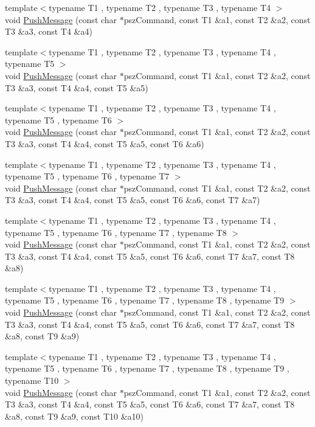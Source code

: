 \begin{DoxyCompactItemize}
\item 
{\footnotesize template$<$typename T1 , typename T2 , typename T3 , typename T4 $>$ }\\void \hyperlink{class_c_node_a2958ee10e2c96ef647787bce80196079}{Push\+Message} (const char $\ast$psz\+Command, const T1 \&a1, const T2 \&a2, const T3 \&a3, const T4 \&a4)
\item 
{\footnotesize template$<$typename T1 , typename T2 , typename T3 , typename T4 , typename T5 $>$ }\\void \hyperlink{class_c_node_a1f58deeed29baf57c49dae177f8be826}{Push\+Message} (const char $\ast$psz\+Command, const T1 \&a1, const T2 \&a2, const T3 \&a3, const T4 \&a4, const T5 \&a5)
\item 
{\footnotesize template$<$typename T1 , typename T2 , typename T3 , typename T4 , typename T5 , typename T6 $>$ }\\void \hyperlink{class_c_node_a4addbff355c502fb2f8c10451e76373d}{Push\+Message} (const char $\ast$psz\+Command, const T1 \&a1, const T2 \&a2, const T3 \&a3, const T4 \&a4, const T5 \&a5, const T6 \&a6)
\item 
{\footnotesize template$<$typename T1 , typename T2 , typename T3 , typename T4 , typename T5 , typename T6 , typename T7 $>$ }\\void \hyperlink{class_c_node_ab3611cdb08d5f25a4da05fe140e48625}{Push\+Message} (const char $\ast$psz\+Command, const T1 \&a1, const T2 \&a2, const T3 \&a3, const T4 \&a4, const T5 \&a5, const T6 \&a6, const T7 \&a7)
\item 
{\footnotesize template$<$typename T1 , typename T2 , typename T3 , typename T4 , typename T5 , typename T6 , typename T7 , typename T8 $>$ }\\void \hyperlink{class_c_node_af91d09012aa7e879be4b488b0bba903d}{Push\+Message} (const char $\ast$psz\+Command, const T1 \&a1, const T2 \&a2, const T3 \&a3, const T4 \&a4, const T5 \&a5, const T6 \&a6, const T7 \&a7, const T8 \&a8)
\item 
{\footnotesize template$<$typename T1 , typename T2 , typename T3 , typename T4 , typename T5 , typename T6 , typename T7 , typename T8 , typename T9 $>$ }\\void \hyperlink{class_c_node_a1af04d8219e8e6aafe5b6446000cd9ff}{Push\+Message} (const char $\ast$psz\+Command, const T1 \&a1, const T2 \&a2, const T3 \&a3, const T4 \&a4, const T5 \&a5, const T6 \&a6, const T7 \&a7, const T8 \&a8, const T9 \&a9)
\item 
{\footnotesize template$<$typename T1 , typename T2 , typename T3 , typename T4 , typename T5 , typename T6 , typename T7 , typename T8 , typename T9 , typename T10 $>$ }\\void \hyperlink{class_c_node_a64f2ffdff9a32458d6fede8324dfd59f}{Push\+Message} (const char $\ast$psz\+Command, const T1 \&a1, const T2 \&a2, const T3 \&a3, const T4 \&a4, const T5 \&a5, const T6 \&a6, const T7 \&a7, const T8 \&a8, const T9 \&a9, const T10 \&a10)

\end{DoxyCompactItemize}
